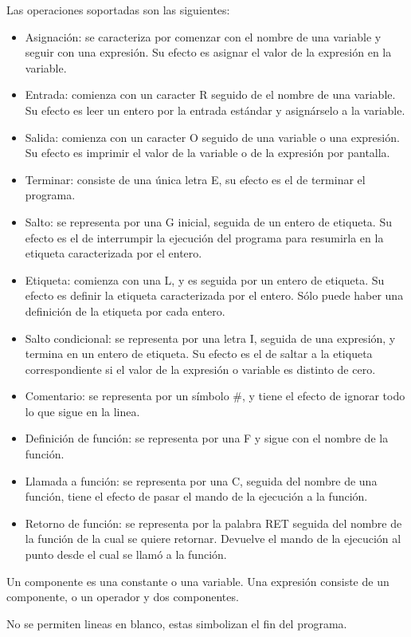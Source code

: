 \documentclass[12pt,spanish]{article}
\begin{document}
\noindent Las operaciones soportadas son las siguientes:
\begin{itemize}
\item{Asignación: se caracteriza por comenzar con el nombre de una variable y seguir con una expresión. Su efecto es asignar el valor de la expresión en la variable.}
\item{Entrada: comienza con un caracter R seguido de el nombre de una variable. Su efecto es leer un entero por la entrada estándar y asignárselo a la variable.}
\item{Salida: comienza con un caracter O seguido de una variable o una expresión. Su efecto es imprimir el valor de la variable o de la expresión por pantalla.}
\item{Terminar: consiste de una única letra E, su efecto es el de terminar el programa.}
\item{Salto: se representa por una G inicial, seguida de un entero de etiqueta. Su efecto es el de interrumpir la ejecución del programa para resumirla en la etiqueta caracterizada por el entero.}
\item{Etiqueta: comienza con una L, y es seguida por un entero de etiqueta. Su efecto es definir la etiqueta caracterizada por el entero. Sólo puede haber una definición de la etiqueta por cada entero.}
\item{Salto condicional: se representa por una letra I, seguida de una expresión, y termina en un entero de etiqueta. Su efecto es el de saltar a la etiqueta correspondiente si el valor de la expresión o variable es distinto de cero.}
\item{Comentario: se representa por un símbolo \#, y tiene el efecto de ignorar todo lo que sigue en la linea.}
\item{Definición de función: se representa por una F y sigue con el nombre de la función.}
\item{Llamada a función: se representa por una C, seguida del nombre de una función, tiene el efecto de pasar el mando de la ejecución a la función.}
\item{Retorno de función: se representa por la palabra RET seguida del nombre de la función de la cual se quiere retornar. Devuelve el mando de la ejecución al punto desde el cual se llamó a la función.}
\end{itemize}

\noindent Un componente es una constante o una variable. Una expresión consiste de un componente, o un operador y dos componentes.

\noindent No se permiten lineas en blanco, estas simbolizan el fin del programa.
\end{document}
